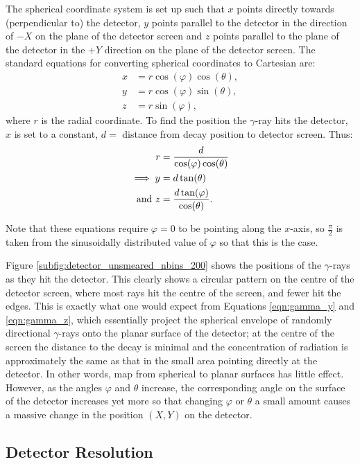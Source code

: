 The spherical coordinate system is set up such that $x$ points directly towards (perpendicular to) the detector, $y$ points parallel to the detector in the direction of $-X$ on the plane of the detector screen and $z$ points parallel to the plane of the detector in the $+Y$ direction on the plane of the detector screen. The standard equations for converting spherical coordinates to Cartesian are:
\begin{align}
    x &= r\cos(\varphi)\cos(\theta), \\
    y &= r\cos(\varphi)\sin(\theta), \\
    z &= r\sin(\varphi),
\end{align} where $r$ is the radial coordinate. To find the position the $\gamma$-ray hits the detector, $x$ is set to a constant, $d = $ distance from decay position to detector screen. Thus:
\begin{align}
    r &= \frac{d}{\cos(\varphi)\cos(\theta)} \notag \\
    \implies y &= d\tan(\theta) \label{eqn:gamma_y} \\
    \text{and}~z &= \frac{d\tan(\varphi)}{\cos(\theta)}. \label{eqn:gamma_z}
\end{align}

Note that these equations require $\varphi = 0$ to be pointing along the $x$-axis, so $\frac{\pi}{2}$ is taken from the sinusoidally distributed value of $\varphi$ so that this is the case.

Figure \ref{subfig:detector_unsmeared_nbins_200} shows the positions of the $\gamma$-rays as they hit the detector. This clearly shows a circular pattern on the centre of the detector screen, where most rays hit the centre of the screen, and fewer hit the edges. This is exactly what one would expect from Equations \ref{eqn:gamma_y} and \ref{eqn:gamma_z}, which essentially project the spherical envelope of randomly directional $\gamma$-rays onto the planar surface of the detector; at the centre of the screen the distance to the decay is minimal and the concentration of radiation is approximately the same as that in the small area pointing directly at the detector. In other words, map from spherical to planar surfaces has little effect. However, as the angles $\varphi$ and $\theta$ increase, the corresponding angle on the surface of the detector increases yet more so that changing $\varphi$ or $\theta$ a small amount causes a massive change in the position $(X,Y)$ on the detector.

\subsection{Detector Resolution}
\label{subsec:detector_resolution}

